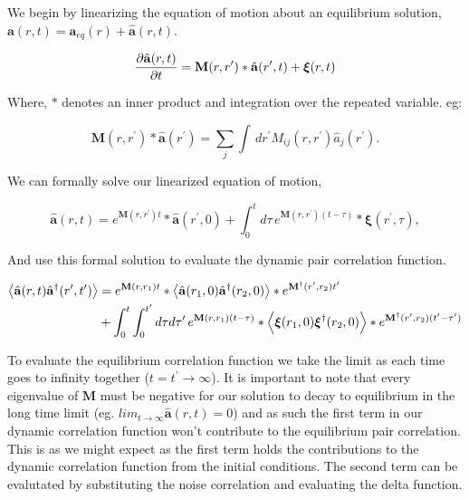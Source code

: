 We begin by linearizing the equation of motion about an equilibrium solution, $\mathbf{a}(r, t) = \mathbf{a}_{eq}(r) + \hat{\mathbf{a}}(r, t)$.

\begin{equation}
	\frac{\partial \hat{\mathbf{a}} (r, t)}{\partial t} = \mathbf{M}(r, r^\prime) \ast \hat{\mathbf{a}}(r^\prime, t) + \boldsymbol{\xi}(r, t)
\end{equation}

Where, $\ast$ denotes an inner product and integration over the repeated variable. eg:

\begin{equation}
	\mathbf{M}(r, r^\prime)\ast \hat{\mathbf{a}}(r^\prime) = \sum_j \int\,dr^\prime M_{ij}(r, r^\prime) \hat{a}_j(r^\prime).
\end{equation}

We can formally solve our linearized equation of motion,

\begin{equation}
	\hat{\mathbf{a}}(r, t) = e^{\mathbf{M}(r, r^\prime)t}\ast\hat{\mathbf{a}}(r^\prime, 0) + \int_0^t d\tau\, e^{\mathbf{M}(r, r^\prime)(t-\tau)} \ast \boldsymbol{\xi} (r^\prime, \tau),
\end{equation}

And use this formal solution to evaluate the dynamic pair correlation function.

\begin{align}
	\left\langle \hat{\mathbf{a}}(r, t)\hat{\mathbf{a}}^\dagger(r^\prime, t^\prime) \right\rangle &= e^{\mathbf{M}(r, r_1)t}\ast\left\langle \hat{\mathbf{a}}(r_1, 0)\hat{\mathbf{a}}^\dagger(r_2, 0) \right\rangle \ast e^{\mathbf{M}^\dagger(r^\prime, r_2)t^\prime} \nonumber \\
	&+ \int_0^t \int_0^{t^\prime}d\tau d\tau^\prime\, e^{\mathbf{M}(r, r_1)(t-\tau)}\ast\left\langle \boldsymbol{\xi}(r_1, 0)\boldsymbol{\xi}^\dagger(r_2, 0) \right\rangle \ast e^{\mathbf{M}^\dagger(r^\prime, r_2)(t^\prime-\tau^\prime)}
\end{align}

To evaluate the equilibrium correlation function we take the limit as each time goes to infinity together ($t = t^\prime \rightarrow \infty$). It is important to note that every eigenvalue of $\mathbf{M}$ must be negative for our solution to decay to equilibrium in the long time limit (eg. $lim_{t\rightarrow\infty}\hat{\mathbf{a}}(r, t) = 0$) and as such the first term in our dynamic correlation function won't contribute to the equilibrium pair correlation. This is as we might expect as the first term holds the contributions to the dynamic correlation function from the initial conditions. The second term can be evalutated by substituting the noise correlation and evaluating the delta function.

